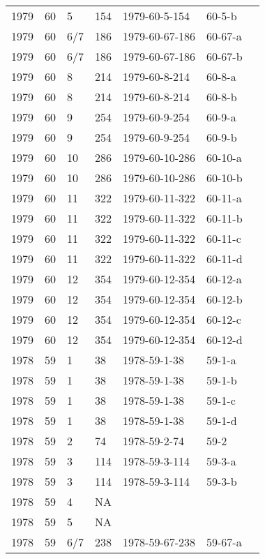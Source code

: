 \begin{longtable}{ |l|l|l|l|p{2.7cm}|l|p{2cm}| }
 1979 & 60 &     5 &     154 & 1979-60-5-154  & 60-5-b & \\
 1979 & 60 &   6/7 &     186 & 1979-60-67-186 & 60-67-a & \\
 1979 & 60 &   6/7 &     186 & 1979-60-67-186 & 60-67-b & \\
 1979 & 60 &     8 &     214 & 1979-60-8-214  & 60-8-a & \\
 1979 & 60 &     8 &     214 & 1979-60-8-214  & 60-8-b & \\
 1979 & 60 &     9 &     254 & 1979-60-9-254  & 60-9-a & \\
 1979 & 60 &     9 &     254 & 1979-60-9-254  & 60-9-b & \\
 1979 & 60 &    10 &     286 & 1979-60-10-286 & 60-10-a & \\
 1979 & 60 &    10 &     286 & 1979-60-10-286 & 60-10-b & \\
 1979 & 60 &    11 &     322 & 1979-60-11-322 & 60-11-a & \\
 1979 & 60 &    11 &     322 & 1979-60-11-322 & 60-11-b & \\
 1979 & 60 &    11 &     322 & 1979-60-11-322 & 60-11-c & \\
 1979 & 60 &    11 &     322 & 1979-60-11-322 & 60-11-d & \\
 1979 & 60 &    12 &     354 & 1979-60-12-354 & 60-12-a & \\
 1979 & 60 &    12 &     354 & 1979-60-12-354 & 60-12-b & \\
 1979 & 60 &    12 &     354 & 1979-60-12-354 & 60-12-c & \\
 1979 & 60 &    12 &     354 & 1979-60-12-354 & 60-12-d & \\
 1978 & 59 &     1 &      38 & 1978-59-1-38   & 59-1-a & \\
 1978 & 59 &     1 &      38 & 1978-59-1-38   & 59-1-b & \\
 1978 & 59 &     1 &      38 & 1978-59-1-38   & 59-1-c & \\
 1978 & 59 &     1 &      38 & 1978-59-1-38   & 59-1-d & \\
 1978 & 59 &     2 &      74 & 1978-59-2-74   & 59-2 & \\
 1978 & 59 &     3 &     114 & 1978-59-3-114  & 59-3-a & \\
 1978 & 59 &     3 &     114 & 1978-59-3-114  & 59-3-b & \\
 1978 & 59 &     4 &      NA &                &  & \\
 1978 & 59 &     5 &      NA &                &  & \\
 1978 & 59 &   6/7 &     238 & 1978-59-67-238 & 59-67-a & \\

\end{longtable}
